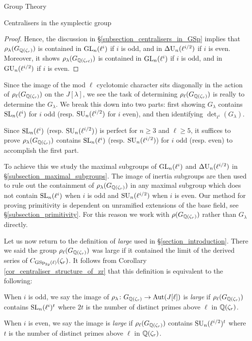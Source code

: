 \documentclass[11pt,a4paper]{article}
\newcommand{\rcyclo}{\QQ(\zeta_r)}
\newcommand{\GQr}{G_{\QQ(\zeta_{r})}}
\newcommand{\GQrl}{G_{\QQ(\zeta_{r\ell})}}
\newcommand{\zr}{\zeta_r}
\newcommand{\Glam}{G_{\lambda}}
\begin{document}
\begin{section}{Group Theory}
\begin{subsection}{Centralisers in the symplectic group}
\begin{proof}
    Hence, the discussion in \S \ref{subsection_centralisers_in_GSp} implies that $\rho_\lambda(\GQr)$ is contained in $\GL_n(\ell^i)$ if $i$ is odd, and in $\DU_n(\ell^{i/2})$ if $i$ is even.
    Moreover, it shows $\rho_\lambda(\GQrl)$ is contained in $\GL_n(\ell^i)$ if $i$ is odd, and in $\GU_n(\ell^{i/2})$ if $i$ is even.
\end{proof}





Since the image of the mod $\ell$ cyclotomic character sits diagonally in the action of $\rho_\ell(\GQr)$ on the $J[\lambda]$, we see the task of determining $\rho_\ell(\GQr)$ is really to determine the $\Glam$.
We break this down into two parts: first showing $\Glam$ contains $\SL_n(\ell^i)$ for $i$ odd (resp. $\SU_n(\ell^{i/2})$ for $i$ even), and then identifying $\det_{\ell^i}(\Glam)$.

Since $\SL_n(\ell^i)$ (resp. $\SU_n(\ell^{i/2})$) is perfect for $n\geq 3$ and $\ell\geq 5$, it suffices to prove $\rho_\lambda(\GQr)$ contains $\SL_n(\ell^i)$ (resp. $\SU_n(\ell^{i/2})$) for $i$ odd (resp. even) to accomplish the first part.

To achieve this we study the maximal subgroups of $\GL_n(\ell^i)$ and $\DU_n(\ell^{i/2})$ in \S \ref{subsection_maximal_subgroups}.
The image of inertia subgroups are then used to rule out the containment of $\rho_\lambda(\GQr)$ in any maximal subgroup which does not contain $\SL_n(\ell^i)$ when $i$ is odd and $\SU_n(\ell^{i/2})$ when $i$ is even.
Our method for proving primitivity is dependent on unramified extensions of the base field, see \S \ref{subsection_primitivity}.
For this reason we work with $\rho(\GQr)$ rather than $\Glam$ directly.


Let us now return to the definition of \emph{large} used in \S \ref{section_introduction}.
There we said the group $\rho_\ell(\GQr)$ was large if it contained the limit of the derived series of $C_{\GSp_{2g}(\ell)}(\zr)$. 
It follows from Corollary \ref{cor_centraliser_structure_of_zr} that this definition is equivalent to the following:

\begin{definition}
When $i$ is odd, we say the image of $\rho_\lambda\colon\GQr \rightarrow \Aut(J[\ell])$ is \emph{large} if $\rho_\ell(\GQr)$ contains $\SL_{n}(\ell^i)^t$ where $2t$ is the number of distinct primes above $\ell$ in $\rcyclo$.

When $i$ is even,  we say the image is \emph{large} if $\rho_\ell(\GQr)$ contains $\SU_{n}(\ell^{i/2})^t$ where $t$ is the number of distinct primes above $\ell$ in $\rcyclo$.
\end{definition}


\end{subsection}
\end{section}
\end{document}
